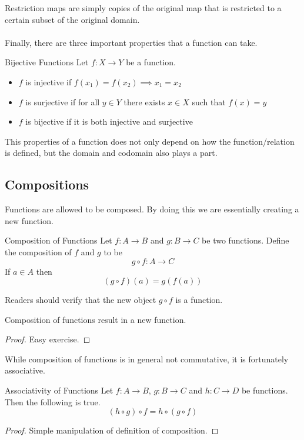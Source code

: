 \documentclass[a4paper]{article}
\begin{document}
Restriction maps are simply copies of the original map that is restricted to a certain subset of the original domain. \\~\\

Finally, there are three important properties that a function can take. 

\begin{defn}{Bijective Functions}{} Let $f:X\to Y$ be a function. 
\begin{itemize}
\item $f$ is injective if $f(x_1)=f(x_2)\implies x_1=x_2$
\item $f$ is surjective if for all $y\in Y$ there exists $x\in X$ such that $f(x)=y$
\item $f$ is bijective if it is both injective and surjective
\end{itemize}
\end{defn}

This properties of a function does not only depend on how the function/relation is defined, but the domain and codomain also plays a part. 

\subsection{Compositions}
Functions are allowed to be composed. By doing this we are essentially creating a new function. 
\begin{defn}{Composition of Functions}{} Let $f:A\to B$ and $g:B\to C$ be two functions. Define the composition of $f$ and $g$ to be $$g\circ f:A\to C$$ If $a\in A$ then $$(g\circ f)(a)=g(f(a))$$
\end{defn}

Readers should verify that the new object $g\circ f$ is a function. 

\begin{lmm}{}{} Composition of functions result in a new function. \tcbline
\begin{proof}
Easy exercise. 
\end{proof}
\end{lmm}

While composition of functions is in general not commutative, it is fortunately associative. 

\begin{prp}{Associativity of Functions}{} Let $f:A\to B$, $g:B\to C$ and $h:C\to D$ be functions. Then the following is true. $$(h\circ g)\circ f=h\circ(g\circ f)$$\tcbline
\begin{proof}
Simple manipulation of definition of composition. 
\end{proof}
\end{prp}
\end{document}
